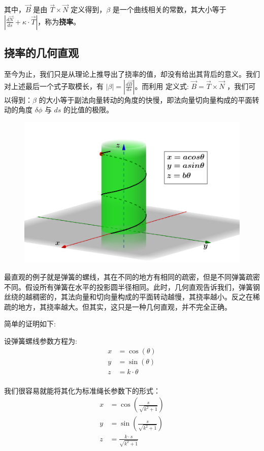 \documentclass[fontset=windows]{article}
\begin{document}
其中，$\vec B$ 是由 $\vec T \times \vec N$ 定义得到，$\beta$ 是一个曲线相关的常数，其大小等于 $|\frac{d\vec N}{ds} + \kappa \cdot \vec T|$，称为\textbf{挠率}。

\subsection{挠率的几何直观}

至今为止，我们只是从理论上推导出了挠率的值，却没有给出其背后的意义。我们对上述最后一个式子取模长，有 $|\beta| = |\frac{d\vec B}{ds}|$。而利用 定义式: $\vec B = \vec T \times \vec N$ ，我们可以得到：$\beta$ 的大小等于副法向量转动的角度的快慢，即法向量切向量构成的平面转动的角度 $\delta \phi$ 与 $ds$ 的比值的极限。

\begin{figure}[htb]
	\centering
	\includegraphics[scale=0.5]{3.png}
	\caption{}
\end{figure}

最直观的例子就是弹簧的螺线，其在不同的地方有相同的疏密，但是不同弹簧疏密不同。假设所有弹簧在水平的投影圆半径相同。此时，几何直观告诉我们，弹簧钢丝绕的越稠密的，其法向量和切向量构成的平面转动越慢，其挠率越小。反之在稀疏的地方，其挠率越大。但其实，这只是一种几何直观，并不完全正确。

简单的证明如下:

设弹簧螺线参数方程为:
$$
\begin{aligned}
    x &= \cos(\theta)      \\
    y &= \sin(\theta)      \\
    z &= k \cdot \theta    \\
\end{aligned}
$$

我们很容易就能将其化为标准绳长参数下的形式：
$$
\begin{aligned}
    x &= \cos(\frac{s}{\sqrt{k^2 + 1}})  \\ 
    y &= \sin(\frac{s}{\sqrt{k^2 + 1}})  \\
    z &= \frac{k \cdot s}{\sqrt{k^2+1}}
\end{aligned}
$$
\end{document}
